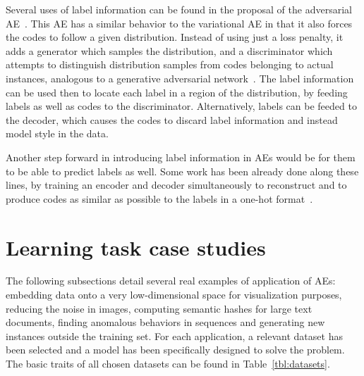 Several uses of label information can be found in the proposal of the adversarial AE~. This AE has a similar behavior to the variational AE in that it also forces the codes to follow a given distribution. Instead of using just a loss penalty, it adds a generator which samples the distribution, and a discriminator which attempts to distinguish distribution samples from codes belonging to actual instances, analogous to a generative adversarial network~. The label information can be used then to locate each label in a region of the distribution, by feeding labels as well as codes to the discriminator. Alternatively, labels can be feeded to the decoder, which causes the codes to discard label information and instead model style in the data.

Another step forward in introducing label information in AEs would be for them to be able to predict labels as well. Some work has been already done along these lines, by training an encoder and decoder simultaneously to reconstruct and to produce codes as similar as possible to the labels in a one-hot format~.

\section{Learning task case studies}\label{sec:cs}

The following subsections detail several real examples of application of AEs: embedding data onto a very low-dimensional space for visualization purposes, reducing the noise in images, computing semantic hashes for large text documents, finding anomalous behaviors in sequences and generating new instances outside the training set. For each application, a relevant dataset has been selected and a model has been specifically designed to solve the problem. The basic traits of all chosen datasets can be found in Table~\ref{tbl:datasets}.


